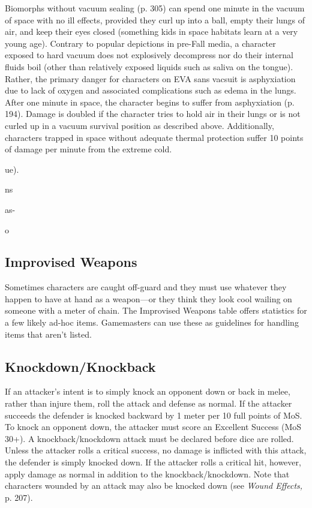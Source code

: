 Biomorphs without vacuum sealing (p. 305) can 
spend one minute in the vacuum of space with no ill 
effects, provided they curl up into a ball, empty their 
lungs of air, and keep their eyes closed (something kids 
in space habitats learn at a very young age). Contrary 
to popular depictions in pre-Fall media, a character 
exposed to hard vacuum does not explosively decompress
nor do their internal fluids boil (other than
relatively exposed liquids such as saliva on the tongue). 
Rather, the primary danger for characters on EVA sans 
vacsuit is asphyxiation due to lack of oxygen and associated
complications such as edema in the lungs.
After one minute in space, the character begins to 
suffer from asphyxiation (p. 194). Damage is doubled 
if the character tries to hold air in their lungs or is not 
curled up in a vacuum survival position as described 
above. Additionally, characters trapped in space without
adequate thermal protection suffer 10 points of
damage per minute from the extreme cold.

ue). 

ns

as-

o

\subsection{Improvised Weapons}

Sometimes characters are caught off-guard and they 
must use whatever they happen to have at hand as 
a weapon—or they think they look cool wailing on 
someone with a meter of chain. The Improvised Weapons
table offers statistics for a few likely ad-hoc items.
Gamemasters can use these as guidelines for handling 
items that aren't listed.

\subsection{Knockdown/Knockback}

If an attacker's intent is to simply knock an opponent 
down or back in melee, rather than injure them, roll 
the attack and defense as normal. If the attacker succeeds
the defender is knocked backward by 1 meter
per 10 full points of MoS. To knock an opponent 
down, the attacker must score an Excellent Success 
(MoS 30+). A knockback/knockdown attack must be 
declared before dice are rolled.
Unless the attacker rolls a critical success, no 
damage is inflicted with this attack, the defender is 
simply knocked down. If the attacker rolls a critical 
hit, however, apply damage as normal in addition to 
the knockback/knockdown.
Note that characters wounded by an attack may 
also be knocked down (see \textit{Wound Effects,} p. 207).

